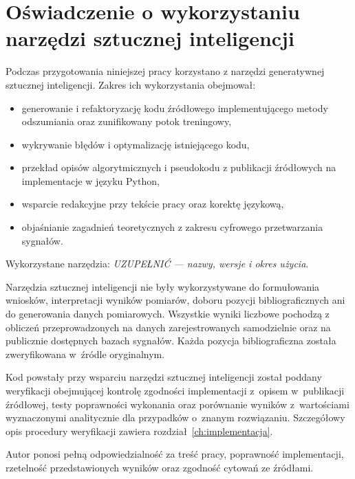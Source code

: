 

\chapter*{Oświadczenie o wykorzystaniu narzędzi sztucznej inteligencji}

Podczas przygotowania niniejszej pracy korzystano z narzędzi generatywnej sztucznej
inteligencji. Zakres ich wykorzystania obejmował:

\begin{itemize}
  \item generowanie i refaktoryzację kodu źródłowego implementującego metody
        odszumiania oraz zunifikowany potok treningowy,
  \item wykrywanie błędów i optymalizację istniejącego kodu,
  \item przekład opisów algorytmicznych i pseudokodu z publikacji źródłowych
        na implementacje w języku Python,
  \item wsparcie redakcyjne przy tekście pracy oraz korektę językową,
  \item objaśnianie zagadnień teoretycznych z zakresu cyfrowego przetwarzania sygnałów.
\end{itemize}

Wykorzystane narzędzia: \textit{UZUPEŁNIĆ --- nazwy, wersje i okres użycia}.

Narzędzia sztucznej inteligencji nie były wykorzystywane do formułowania wniosków,
interpretacji wyników pomiarów, doboru pozycji bibliograficznych ani do generowania
danych pomiarowych. Wszystkie wyniki liczbowe pochodzą z obliczeń przeprowadzonych na
danych zarejestrowanych samodzielnie oraz na publicznie dostępnych bazach sygnałów.
Każda pozycja bibliograficzna została zweryfikowana w~źródle oryginalnym.

Kod powstały przy wsparciu narzędzi sztucznej inteligencji został poddany weryfikacji
obejmującej kontrolę zgodności implementacji z~opisem w~publikacji źródłowej, testy
poprawności wykonania oraz porównanie wyników z~wartościami wyznaczonymi analitycznie
dla przypadków o~znanym rozwiązaniu. Szczegółowy opis procedury weryfikacji zawiera
rozdział~\ref{ch:implementacja}.

Autor ponosi pełną odpowiedzialność za treść pracy, poprawność implementacji,
rzetelność przedstawionych wyników oraz zgodność cytowań ze źródłami.
